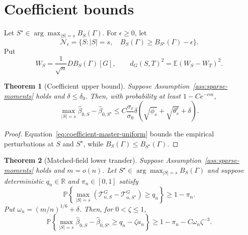 \documentclass[a4paper,11pt,english]{article}
\newtheorem{theorem}{Theorem}[section]
\newcommand{\E}{\mathbb E}
\newcommand{\Prob}{\mathbb P}
\newcommand{\R}{\mathbb R}
\begin{document}
\section{Coefficient bounds}

Let $S^\star\in\arg\max_{|S|=s}B_S(\Gamma)$.
For $\epsilon\ge0$, let
\begin{equation}\label{eq:near-optimal-family}
        \mathcal N_\epsilon
        =\{S:|S|=s,\quad
        B_S(\Gamma)\ge B_{S^\star}(\Gamma)-\epsilon\}.
\end{equation}
Put
\begin{equation}\label{eq:linear-matched-field}
        W_S=\frac1{\sqrt n}DB_S(\Gamma)[G],
        \qquad
        d_G(S,T)^2=\E(W_S-W_T)^2.
\end{equation}

\begin{theorem}[Coefficient upper bound]
\label{thm:coefficient-bounds}
Suppose Assumption~\ref{ass:sparse-moments} holds and
$\delta\le\delta_0$.  Then, with probability at least $1-Ce^{-cm}$,
\begin{equation}\label{eq:coefficient-upper}
        \max_{|S|=s}\hat\beta_{0,S}
        -\hat\beta_{0,S^\star}
        \le C\frac{\sigma_r}{\sigma_0}\delta
        (\sqrt{\phi_s}+\sqrt{\theta_s^r}+\delta).
\end{equation}
\end{theorem}

\begin{proof}
Equation~\eqref{eq:coefficient-master-uniform} bounds the empirical
perturbations at $S$ and $S^\star$, while
$B_S(\Gamma)\le B_{S^\star}(\Gamma)$.
\end{proof}

\begin{theorem}[Matched-field lower transfer]
\label{thm:matched-field-lower}
Suppose Assumption~\ref{ass:sparse-moments} holds and $m=o(n)$.  Let
$S^\star\in\arg\max_{|S|=s}B_S(\Gamma)$ and suppose deterministic
$q_n\in\R$ and $\pi_n\in[0,1]$ satisfy
\begin{equation}\label{eq:matched-field-quantile}
 \Prob\left\{
 \max_{|S|=s}
 (\mathcal T^G_{n,S}-\mathcal T^G_{n,S^\star})\ge q_n
 \right\}\ge1-\pi_n.
\end{equation}
Put $\omega_n=(m/n)^{1/6}+\delta$.  Then, for $0<\zeta\le1$,
\begin{equation}\label{eq:matched-field-lower-transfer}
 \Prob\left\{
 \max_{|S|=s}\hat\beta_{0,S}-\hat\beta_{0,S^\star}
 \ge q_n-\zeta a_n
 \right\}
 \ge1-\pi_n-C\omega_n\zeta^{-3}.
\end{equation}
\end{theorem}
\end{document}
